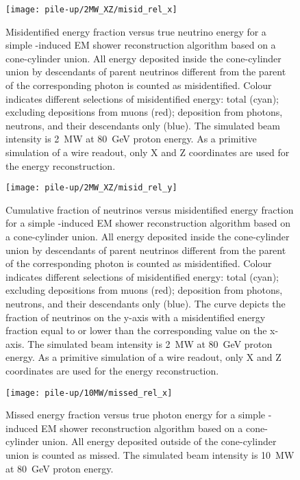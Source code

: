 \begin{figure}[htb]
	\centering
	\texttt{[image: pile-up/2MW\_XZ/misid\_rel\_x]}
	\caption{Misidentified energy fraction versus true neutrino energy for a simple \Pgpz-induced EM shower reconstruction algorithm based on a cone-cylinder union.
		All energy deposited inside the cone-cylinder union by descendants of parent neutrinos different from the parent of the corresponding \Pgpz photon is counted as misidentified.
		Colour indicates different selections of misidentified energy: total (cyan); excluding depositions from muons (red); deposition from photons, neutrons, and their descendants only (blue).
		The simulated beam intensity is \SI{2}{\mega\watt} at \SI{80}{\giga\electronvolt} proton energy.
		As a primitive simulation of a wire readout, only X and Z coordinates are used for the energy reconstruction.}
	\label{fig:dune-nd_2MW-XZ_misid-rel-x}
\end{figure}

\begin{figure}[htb]
	\centering
	\texttt{[image: pile-up/2MW\_XZ/misid\_rel\_y]}
	\caption{Cumulative fraction of neutrinos versus misidentified energy fraction for a simple \Pgpz-induced EM shower reconstruction algorithm based on a cone-cylinder union.
		All energy deposited inside the cone-cylinder union by descendants of parent neutrinos different from the parent of the corresponding \Pgpz photon is counted as misidentified.
		Colour indicates different selections of misidentified energy: total (cyan); excluding depositions from muons (red); deposition from photons, neutrons, and their descendants only (blue).
		The curve depicts the fraction of neutrinos on the y-axis with a misidentified energy fraction equal to or lower than the corresponding value on the x-axis.
		The simulated beam intensity is \SI{2}{\mega\watt} at \SI{80}{\giga\electronvolt} proton energy.
		As a primitive simulation of a wire readout, only X and Z coordinates are used for the energy reconstruction.}
	\label{fig:dune-nd_2MW-XZ_misid-rel-y}
\end{figure}

\begin{figure}[htb]
	\centering
	\texttt{[image: pile-up/10MW/missed\_rel\_x]}
	\caption{Missed energy fraction versus true photon energy for a simple \Pgpz-induced EM shower reconstruction algorithm based on a cone-cylinder union.
		All energy deposited outside of the cone-cylinder union is counted as missed.
		The simulated beam intensity is \SI{10}{\mega\watt} at \SI{80}{\giga\electronvolt} proton energy.}
	\label{fig:dune-nd_10MW_missed-rel-x}
\end{figure}

